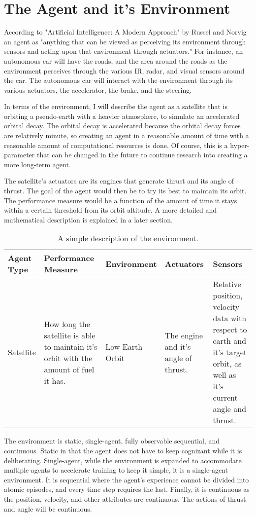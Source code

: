 \documentclass{article}
\begin{document}
\section{The Agent and it's Environment}

According to "Artificial Intelligence: A Modern Approach" by Russel and Norvig an agent as "anything that can be viewed as perceiving its environment through sensors and acting upon that environment through actuators." For instance, an autonomous car will have the roads, and the area around the roads as the environment perceives through the various IR, radar, and visual sensors around the car. The autonomous car will interact with the environment through its various actuators, the accelerator, the brake, and the steering. 

In terms of the environment, I will describe the agent as a satellite that is orbiting a pseudo-earth with a heavier atmosphere, to simulate an accelerated orbital decay. The orbital decay is accelerated because the orbital decay forces are relatively minute, so creating an agent in a reasonable amount of time with a reasonable amount of computational resources is done. Of course, this is a hyper-parameter that can be changed in the future to continue research into creating a more long-term agent.  

The satellite's actuators are its engines that generate thrust and its angle of thrust. The goal of the agent would then be to try its best to maintain its orbit. The performance measure would be a function of the amount of time it stays within a certain threshold from its orbit altitude. A more detailed and mathematical description is explained in a later section.

\begin{table}
\caption{A simple description of the environment.}
\begin{tabularx}{\columnwidth}{|X||X|X|X|X|} \hline
Agent Type & Performance Measure & Environment & Actuators & Sensors \\ \hline
Satellite  & How long the satellite is able to maintain it's orbit with the amount of fuel it has. & 
Low Earth Orbit & The engine and it's angle of thrust. & Relative position, velocity data with respect to earth and it's target orbit, as well as it's current angle and thrust. \\ \hline
\end{tabularx}
\end{table}

The environment is static, single-agent, fully observable sequential, and continuous. Static in that the agent does not have to keep cognizant while it is deliberating. Single-agent, while the environment is expanded to accommodate multiple agents to accelerate training to keep it simple, it is a single-agent environment. It is sequential where the agent's experience cannot be divided into atomic episodes, and every time step requires the last. Finally, it is continuous as the position, velocity, and other attributes are continuous. The actions of thrust and angle will be continuous. 
\end{document}
